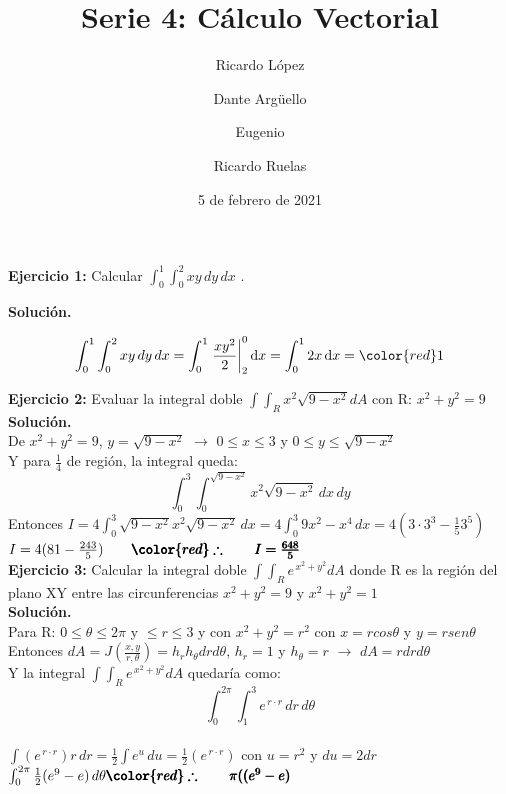 \documentclass[12pt]{article}
\date{5 de febrero de 2021}
\title{Serie 4: Cálculo Vectorial}
\author{Ricardo López \and Dante Argüello \and Eugenio \and Ricardo Ruelas}
\DeclareMathOperator{\di}{d\!}
\begin{document}
	
\maketitle
	
\newcommand{\Int}{\int\limits}

\newcommand*\eval[3]{\left.#1\right\rvert_{#2}^{#3}}

\noindent \textbf{Ejercicio 1:} Calcular $\int_0^1 \int_0^2 xy \,dy\,dx$ .

\vspace{5mm}

\noindent \textbf{Solución.}
 
\vspace{5mm}

\begin{align*}
\int_0^1 \int_0^2 xy \,dy\,dx = \int_0^1 \eval{\frac{xy^2}{2}}{2}{0} \di x 
= \int_0^1 2x \di x 
= \color {red} 1
\end{align*}

\noindent \textbf{Ejercicio 2:} Evaluar la integral doble $\int\int_{R}x^2\sqrt{9-x^2}dA$ con R: $x^2+y^2=9$ 
\\[10pt]
\textbf{Solución.}
\\[10pt]
De $x^2+y^2=9$, $y=\sqrt{9-x^2}$ $\rightarrow$ $0\leq x\leq3$ y $0\leq y \leq\sqrt{9-x^2}$
\\[2pt]
Y para $\frac{1}{4}$ de región, la integral queda:
\[ \int_{0}^{3} \int_{0}^{\sqrt{9-x^2}}x^2\sqrt{9-x^2} \,dx\,dy \]
Entonces $I=4\int_{0}^{3} \sqrt{9-x^2}x^2\sqrt{9-x^2} \,dx=4\int_{0}^{3} 9x^2-x^4 \,dx=4(3\cdot3^3-\frac{1}{5}3^5)$
\\[4pt]
$I=4(81-\frac{243}{5}) \qquad \pmb{\color{red} \therefore \qquad I=\frac{648}{5}}$
\\[15pt]

\noindent \textbf{Ejercicio 3:} Calcular la integral doble $\int\int_{R}e^{\,x^2+y^2}dA$ donde R es la región del plano XY entre las circunferencias $x^2+y^2=9$  y $x^2+y^2=1$ 
\\[10pt]
\textbf{Solución.}
\\[10pt]
Para R: $0\leq \theta \leq2\pi$ y $\leq r \leq 3$ y con $x^2+y^2=r^2$ con $x=rcos\theta$ y $y=rsen\theta$
\\[2pt]
Entonces $dA=J(\frac{x,y}{r,\theta})=h_{r}h_{\theta}drd\theta$, $h_{r}=1$ y $h_{\theta}=r$ \hspace*{0.25cm}$\rightarrow$ \hspace*{0.25cm} $dA=rdrd\theta$
\\[2pt]
Y la integral $\int\int_{R}e^{\,x^2+y^2}dA$ quedaría como:
\[ \int_{0}^{2\pi} \int_{1}^{3}e^{\,r\cdot r} \,dr\,d\theta \]
\\[2pt]
$\int(e^{\,r\cdot r})r \,dr=\frac{1}{2}\int e^u \,du= \frac{1}{2}(e^{\,r\cdot r})$ con $u=r^2$ y $du=2dr$ $\int_{0}^{2\pi}\frac{1}{2}(e^9-e) \,d\theta \\ \\ \pmb{\color{red} \therefore \qquad \pi((e^9-e)}$
\\[15pt]
\end{document}

